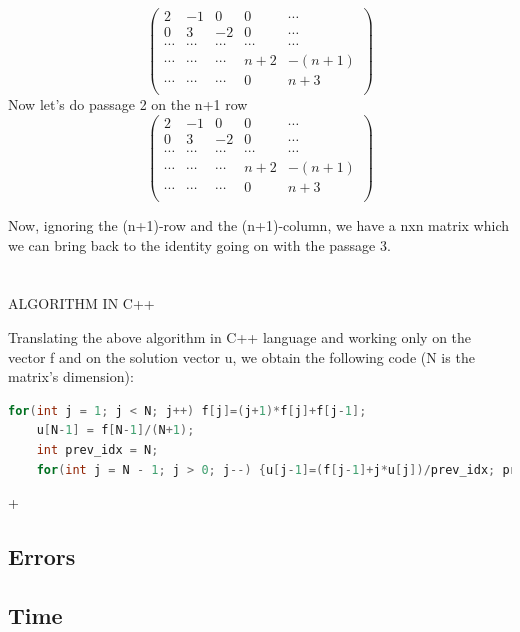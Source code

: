 \documentclass {article}
\begin{document}
\begin{equation}
\left(
\begin{array}{ccccc}
  2 & -1 & 0 & 0 & \cdots \\
  0 & 3 & -2 & 0 & \cdots \\
  \cdots & \cdots & \cdots & \cdots & \cdots \\
  \cdots & \cdots & \cdots & n+2 & -(n+1) \\
  \cdots & \cdots & \cdots & 0 & n+3 \\
\end{array}
\right)
\end{equation}
Now let's do passage 2 on the n+1 row
\begin{equation}
\left(
\begin{array}{ccccc}
  2 & -1 & 0 & 0 & \cdots \\
  0 & 3 & -2 & 0 & \cdots \\
  \cdots & \cdots & \cdots & \cdots & \cdots \\
  \cdots & \cdots & \cdots & n+2 & -(n+1) \\
  \cdots & \cdots & \cdots & 0 & n+3 \\
\end{array}
\right)
\end{equation}

Now, ignoring the (n+1)-row and the (n+1)-column, we have a nxn matrix which we can bring back to the identity going on with the passage 3.
\\
\\
\\
ALGORITHM IN C++

Translating the above algorithm in C++ language and working only on the vector f and on the solution vector u, we obtain the following code (N is the matrix's dimension):

\begin{lstlisting}[language=cpp]
    for(int j = 1; j < N; j++) f[j]=(j+1)*f[j]+f[j-1];
    u[N-1] = f[N-1]/(N+1);
    int prev_idx = N;
    for(int j = N - 1; j > 0; j--) {u[j-1]=(f[j-1]+j*u[j])/prev_idx; prev_idx = j;}
\end{lstlisting}+

\subsection{Errors}



\subsection{Time}
\end{document}

